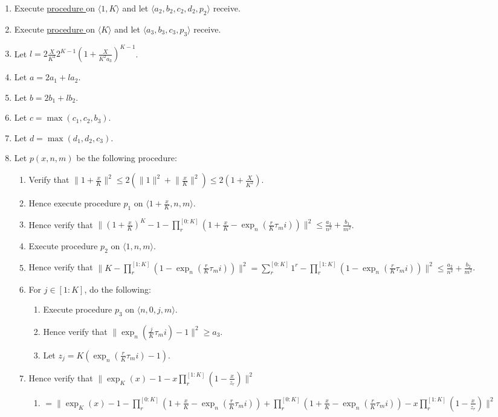 \documentclass{article}
\newcounter{procedure}[part]
\newcommand{\procedurehr}[1]{\hyperref[sec:procedure #1]{procedure \expandafter\csname procedure#1\endcsname}}
\begin{document}
\begin{multicols}{2}
\begin{enumerate}
					\item Execute \procedurehr{3.65} on $\langle 1,K\rangle$ and let $\langle a_2,b_2,c_2,d_2,p_2\rangle$ receive.
					\item Execute \procedurehr{3.63} on $\langle K\rangle$ and let $\langle a_3,b_3,c_3,p_3\rangle$ receive.
					\item Let $l=2\frac{X}{K^2}2^{K-1}(1+\frac{X}{K^2a_3})^{K-1}$.
					\item Let $a=2a_1+la_2$.
					\item Let $b=2b_1+lb_2$.
					\item Let $c=\max(c_1,c_2,b_3)$.
					\item Let $d=\max(d_1,d_2,c_3)$.
					\item Let $p(x,n,m)$ be the following procedure:
					\begin{enumerate}
						\item Verify that $\lVert 1+\frac{x}{K}\rVert^2\le 2(\lVert 1\rVert^2+\lVert\frac{x}{K}\rVert^2)\le 2(1+\frac{X}{K^2})$.
						\item Hence execute procedure $p_1$ on $\langle 1+\frac{x}{K},n,m\rangle$.
						\item Hence verify that $\lVert(1+\frac{x}{K})^K-1-\prod_r^{[0:K]}(1+\frac{x}{K}-\exp_n(\frac{r}{K}\tau_mi))\rVert^2\le\frac{a_1}{n^2}+\frac{b_1}{m^2}$.
						\item Execute procedure $p_2$ on $\langle 1,n,m\rangle$.
						\item Hence verify that $\lVert K-\prod_r^{[1:K]}(1-\exp_n(\frac{r}{K}\tau_mi))\rVert^2=\sum_r^{[0:K]}1^r-\prod_r^{[1:K]}(1-\exp_n(\frac{r}{K}\tau_mi))\rVert^2\le\frac{a_2}{n^2}+\frac{b_2}{m^2}$.
						\item For $j\in[1:K]$, do the following:
						\begin{enumerate}
							\item Execute procedure $p_3$ on $\langle n,0,j,m\rangle$.
							\item Hence verify that $\lVert\exp_n(\frac{j}{K}\tau_mi)-1\rVert^2\ge a_3$.
							\item Let $z_j=K(\exp_n(\frac{r}{K}\tau_mi)-1)$.
						\end{enumerate}
						\item Hence verify that $\lVert\exp_K(x)-1-x\prod_r^{[1:K]}(1-\frac{x}{z_r})\rVert^2$
						\begin{enumerate}
							\item $=\lVert\exp_K(x)-1-\prod_r^{[0:K]}(1+\frac{x}{K}-\exp_n(\frac{r}{K}\tau_mi))+\prod_r^{[0:K]}(1+\frac{x}{K}-\exp_n(\frac{r}{K}\tau_mi))-x\prod_r^{[1:K]}(1-\frac{x}{z_r})\rVert^2$

\end{enumerate}
\end{enumerate}
\end{enumerate}
\end{multicols}
\end{document}
